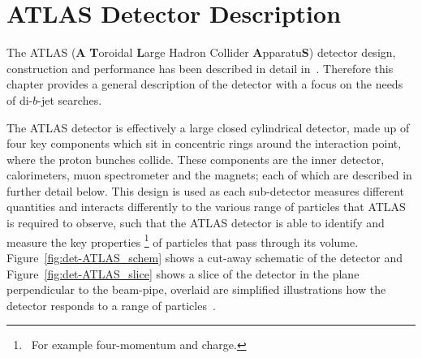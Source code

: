 \section{ATLAS Detector Description}
\label{sec:det-ATLAS}

The ATLAS (\textbf{A} \textbf{T}oroidal \textbf{L}arge Hadron Collider \textbf{A}pparatu\textbf{S}) detector
design, construction and performance has been described in detail in~\cite{det-ATLAS_Exp, det-ATLAS_TDR, det-ATLAS_Perf}.
Therefore this chapter provides a general description of the detector with a focus on the needs of di-$b$-jet searches.

The ATLAS detector is effectively a large closed cylindrical detector,
made up of four key components which sit in concentric rings around the interaction point, where the proton bunches collide.
These components are the inner detector, calorimeters, muon spectrometer and the magnets; each of which are described in further detail below.
This design is used as each sub-detector measures different quantities and interacts differently to the various range of particles that ATLAS is required to observe,
such that the ATLAS detector is able to identify and measure the key properties \footnote{\ For example four-momentum and charge.}
of particles that pass through its volume.
Figure~\ref{fig:det-ATLAS_schem} shows a cut-away schematic of the detector
and Figure~\ref{fig:det-ATLAS_slice} shows a slice of the detector in the plane perpendicular to the beam-pipe,
overlaid are simplified illustrations how the detector responds to a range of particles~\cite{det-thesis_gutchow}.


